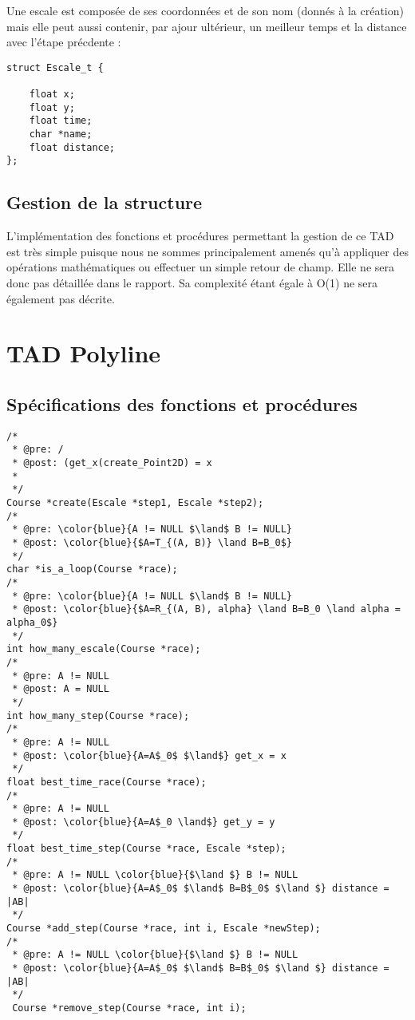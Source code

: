 \documentclass[a4paper, 11pt, oneside]{article}
\begin{document}
Une escale est composée de ses coordonnées et de son nom (donnés à la création) mais elle peut aussi contenir, par ajour ultérieur, un meilleur temps et la distance avec l'étape précdente :
\begin{lstlisting}
struct Escale_t {

    float x;
    float y;
    float time;
    char *name;
    float distance;
};
\end{lstlisting}

\subsection{Gestion de la structure}
L'implémentation des fonctions et procédures permettant la gestion de ce TAD est très simple puisque nous ne sommes principalement amenés qu'à appliquer des opérations mathématiques ou effectuer un simple retour de champ. Elle ne sera donc pas détaillée dans le rapport. Sa complexité étant égale à O(1) ne sera également pas décrite.

\section{TAD Polyline}
\subsection{Spécifications des fonctions et procédures}
\begin{lstlisting}
/* 
 * @pre: /
 * @post: (get_x(create_Point2D) = x 
 * 
 */
Course *create(Escale *step1, Escale *step2);
/* 
 * @pre: \color{blue}{A != NULL $\land$ B != NULL}
 * @post: \color{blue}{$A=T_{(A, B)} \land B=B_0$}
 */
char *is_a_loop(Course *race);
/* 
 * @pre: \color{blue}{A != NULL $\land$ B != NULL}
 * @post: \color{blue}{$A=R_{(A, B), alpha} \land B=B_0 \land alpha = alpha_0$}
 */
int how_many_escale(Course *race);
/* 
 * @pre: A != NULL
 * @post: A = NULL
 */
int how_many_step(Course *race);
/* 
 * @pre: A != NULL
 * @post: \color{blue}{A=A$_0$ $\land$} get_x = x
 */
float best_time_race(Course *race);
/* 
 * @pre: A != NULL
 * @post: \color{blue}{A=A$_0 \land$} get_y = y
 */
float best_time_step(Course *race, Escale *step);
/* 
 * @pre: A != NULL \color{blue}{$\land $} B != NULL
 * @post: \color{blue}{A=A$_0$ $\land$ B=B$_0$ $\land $} distance = |AB|
 */
Course *add_step(Course *race, int i, Escale *newStep);
/* 
 * @pre: A != NULL \color{blue}{$\land $} B != NULL
 * @post: \color{blue}{A=A$_0$ $\land$ B=B$_0$ $\land $} distance = |AB|
 */
 Course *remove_step(Course *race, int i);
\end{lstlisting}
\end{document}
